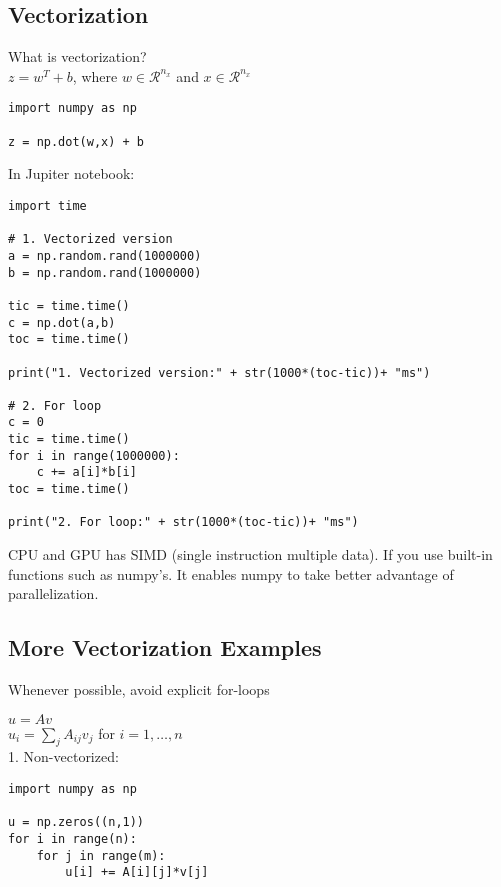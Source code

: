 \documentclass{article}
\begin{document}
\newpage
\subsection{Vectorization}

What is vectorization?\\

$z = w^T+b$, where $w \in \mathcal{R}^{n_x}$ and $x \in \mathcal{R}^{n_x}$\\
\lstset{language=Python}
\begin{lstlisting}
import numpy as np

z = np.dot(w,x) + b
\end{lstlisting}


In Jupiter notebook:\\

\lstset{language=Python}
\begin{lstlisting}
import time

# 1. Vectorized version
a = np.random.rand(1000000)
b = np.random.rand(1000000)

tic = time.time()
c = np.dot(a,b)
toc = time.time()

print("1. Vectorized version:" + str(1000*(toc-tic))+ "ms")

# 2. For loop
c = 0
tic = time.time()
for i in range(1000000):
    c += a[i]*b[i]
toc = time.time()

print("2. For loop:" + str(1000*(toc-tic))+ "ms")
\end{lstlisting}

CPU and GPU has SIMD (single instruction multiple data). If you use built-in functions such as numpy's. It enables numpy to take better advantage of parallelization.

\newpage
\subsection{More Vectorization Examples}

Whenever possible, avoid explicit for-loops

$u = Av$\\
$u_i = \sum_{j}A_{ij}v_j$ for $i=1, \dots, n$\\

1. Non-vectorized:\\

\lstset{language=Python}
\begin{lstlisting}
import numpy as np

u = np.zeros((n,1))
for i in range(n):
    for j in range(m):
        u[i] += A[i][j]*v[j]
\end{lstlisting}
\end{document}
